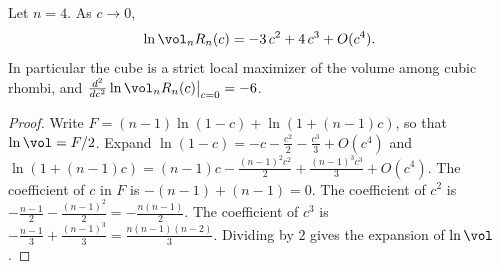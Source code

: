 \begin{theorem}\label{thm:main}
Let $n=4$. As $c\to0$,
\[
\ln\vol_nR_n(c)=-3\,c^2+4\,c^3+O(c^4).
\]
In particular the cube is a strict local maximizer of the volume among cubic rhombi, and $\frac{d^2}{dc^2}\ln\vol_nR_n(c)\big|_{c=0}=-6$.
\end{theorem}
\begin{proof}
Write $F=(n-1)\ln(1-c)+\ln(1+(n-1)c)$, so that $\ln\vol=F/2$.
Expand $\ln(1-c)=-c-\frac{c^2}{2}-\frac{c^3}{3}+O(c^4)$ and $\ln(1+(n-1)c)=(n-1)c-\frac{(n-1)^2c^2}{2}+\frac{(n-1)^3c^3}{3}+O(c^4)$.
The coefficient of $c$ in $F$ is $-(n-1)+(n-1)=0$.
The coefficient of $c^2$ is $-\frac{n-1}{2}-\frac{(n-1)^2}{2}=-\frac{n(n-1)}{2}$.
The coefficient of $c^3$ is $-\frac{n-1}{3}+\frac{(n-1)^3}{3}=\frac{n(n-1)(n-2)}{3}$.
Dividing by $2$ gives the expansion of $\ln\vol$.
\end{proof}
